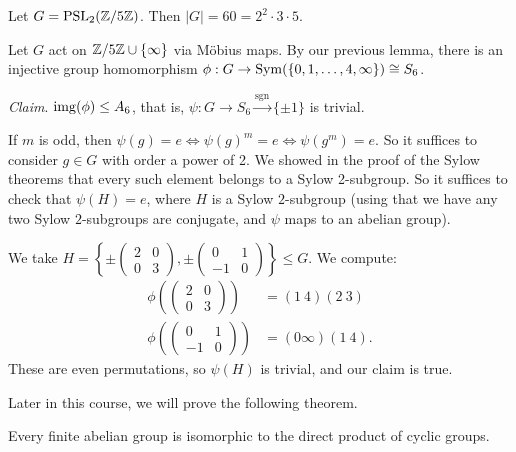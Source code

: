 \documentclass[a4paper]{scrartcl}
\begin{document}
\begin{example}
	Let $G = \operatorname{PSL}_2(\mathbb{Z}/5\mathbb{Z})$. Then $|G| = 60 = 2^2 \cdot 3 \cdot 5$.

	Let $G$ act on $\mathbb{Z}/5\mathbb{Z} \cup \{\infty\}$ via Möbius maps. By our previous lemma, there is an injective group homomorphism $\phi : G \rightarrow \operatorname{Sym}(\{0, 1, \dots, 4, \infty\}) \cong S_6$.

	\emph{Claim}. $\operatorname{img}(\phi) \leq A_6$, that is, $\psi: G \rightarrow S_6 \xrightarrow{\operatorname{sgn}} \{\pm 1\}$ is trivial.

	If $m$ is odd, then $\psi(g) = e \iff \psi(g)^m = e \iff \psi(g^m) = e$. So it suffices to consider $g \in G$ with order a power of 2. We showed in the proof of the Sylow theorems that every such element belongs to a Sylow 2-subgroup. So it suffices to check that $\psi(H) = e$, where $H$ is a Sylow $2$-subgroup (using that we have any two Sylow $2$-subgroups are conjugate, and $\psi$ maps to an abelian group). 

	We take $H =\left\{ \pm \begin{pmatrix}
		2 & 0 \\ 0 & 3
	\end{pmatrix},\pm \begin{pmatrix}
		0 & 1 \\ -1 & 0 
	\end{pmatrix} \right \} \leq G$. We compute:
	\begin{align*}
		\phi\left(\begin{pmatrix}
			2 & 0 \\ 0 & 3
		\end{pmatrix}\right) &= (1\ 4)(2\ 3)\\
		\phi\left(\begin{pmatrix}
		0 & 1 \\ -1 & 0
		\end{pmatrix}\right) &= (0 \infty)(1\ 4).
	\end{align*} 
	These are even permutations, so $\psi(H)$ is trivial, and our claim is true.
\end{example}


Later in this course, we will prove the following theorem.

\begin{theorem}
	Every finite abelian group is isomorphic to the direct product of cyclic groups.
\end{theorem}
\end{document}
